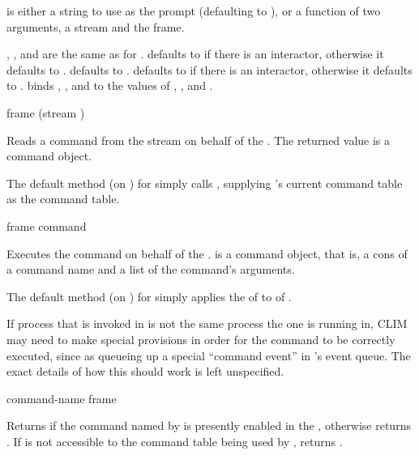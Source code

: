 { is either a string to use as the prompt (defaulting to
), or a function of two arguments, a stream and the frame.

, , and 
are the same as for .   defaults to
 if there is an interactor, otherwise it
defaults to .   defaults to
.   defaults to
 if there is an
interactor, otherwise it defaults to
.
 binds ,
, and  to the values of
, , and .


 {frame \key (stream )}

Reads a command from the stream  on behalf of the 
.  The returned value is a command object.

The default method (on ) for
 simply calls , supplying 's
current command table as the command table.

 {frame command}

Executes the command  on behalf of the  .
 is a command object, that is, a cons of a command name and a list
of the command's arguments.

The default method (on ) for
 simply applies the  of 
to  of .

If process that  is invoked in is not the same process
the one  is running in, CLIM may need to make special provisions in
order for the command to be correctly executed, since as queueing up a special
``command event'' in 's event queue.  The exact details of how this
should work is left unspecified.


 {command-name frame}

Returns  if the command named by  is presently
enabled in the  , otherwise returns .  If
 is not accessible to the command table being used by
,  returns .

}
